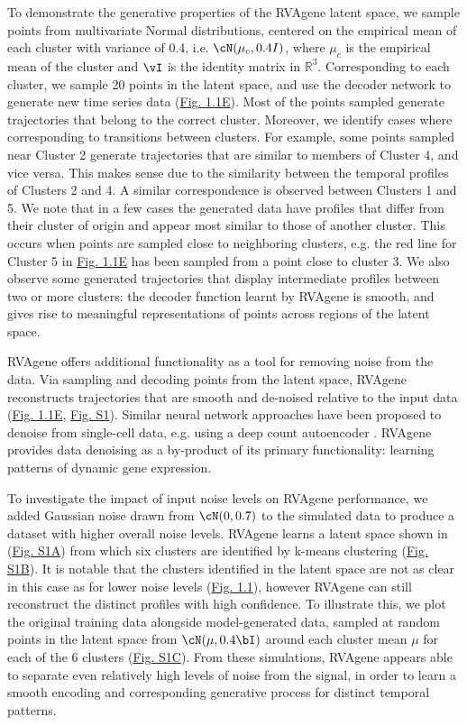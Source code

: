 To demonstrate the generative properties of the RVAgene latent space, we sample points from
multivariate Normal distributions, centered on the empirical mean of each cluster with variance of
0.4, i.e. $\cN(\mu_c, 0.4I)$, where $\mu_c$ is the empirical mean of the cluster and $\vI$ is the
identity matrix in $\mathbb{R}^3$. Corresponding to each cluster, we sample 20 points in the latent
space, and use the decoder network to generate new time series data (\hyperref[fig:fig2]{Fig. 1.1E}). Most of the points sampled generate trajectories that belong to the correct cluster. Moreover, we identify cases where  corresponding to transitions between clusters. For example, some points sampled near Cluster 2 generate trajectories that are similar to members of Cluster 4, and vice versa. This makes sense due to the similarity between the temporal profiles of Clusters 2 and 4. A similar correspondence is observed between Clusters 1 and 5.
{We note that in a few cases the generated data have profiles that differ from their cluster of
origin and appear most similar to those of another cluster. This occurs when points are sampled
close to neighboring clusters, e.g. the red line for Cluster 5 in \hyperref[fig:fig2]{Fig. 1.1E} has been sampled from a point close to cluster 3.}
We also observe some generated trajectories that display intermediate profiles between two or more clusters: the decoder function learnt by RVAgene is smooth, and gives rise to meaningful representations of points across regions of the latent space. 
\par
RVAgene offers additional functionality as a tool for removing noise from the data. Via sampling and
decoding points from the latent space, RVAgene reconstructs trajectories that are smooth and
de-noised relative to the input data (\hyperref[fig:fig2]{Fig. 1.1E}, \hyperref[supp]{Fig. S1}). Similar neural network approaches have been proposed to denoise from single-cell data, e.g. using a deep count autoencoder \citep{eraslan2019single}. RVAgene provides data denoising as a by-product of its primary functionality: learning patterns of dynamic gene expression.
\par
{To investigate the impact of input noise levels on RVAgene performance, we added Gaussian noise
drawn from $\cN(0,0.7)$ to the simulated data to produce a dataset with higher overall noise levels.
RVAgene learns a latent space shown in (\hyperref[supp]{Fig. S1A}) from which six clusters are
identified by k-means clustering (\hyperref[supp]{Fig. S1B}). It is notable that the clusters
identified in the latent space are not as clear in this case as for lower noise levels
(\hyperref[fig:fig2]{Fig. 1.1}), however RVAgene can still reconstruct the distinct profiles with high confidence. To illustrate this, we plot the original training data alongside model-generated data, sampled at random points in the latent space from  $\cN(\mu,0.4\bI)$ around each cluster mean $\mu$ for each of the 6 clusters (\hyperref[supp]{Fig. S1C}). From these simulations, RVAgene appears able to separate even relatively high levels of noise from the signal, in order to learn a smooth encoding and corresponding generative process for distinct temporal patterns.}

